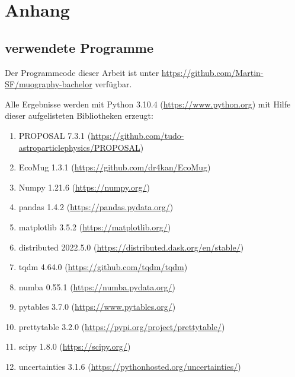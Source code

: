 \chapter{Anhang}


\section{verwendete Programme}

Der Programmcode dieser Arbeit ist unter 
\url{https://github.com/Martin-SF/muography-bachelor}
verfügbar.

Alle Ergebnisse werden mit Python 3.10.4 (\url{https://www.python.org})
mit Hilfe dieser aufgelisteten Bibliotheken erzeugt:
\begin{enumerate}
    \item PROPOSAL 7.3.1 (\url{https://github.com/tudo-astroparticlephysics/PROPOSAL})
    \item EcoMug 1.3.1 (\url{https://github.com/dr4kan/EcoMug})
    \item Numpy 1.21.6 (\url{https://numpy.org/})
    \item pandas 1.4.2 (\url{https://pandas.pydata.org/})
    \item matplotlib 3.5.2 (\url{https://matplotlib.org/})
    \item distributed 2022.5.0 (\url{https://distributed.dask.org/en/stable/})
    \item tqdm 4.64.0 (\url{https://github.com/tqdm/tqdm})
    \item numba 0.55.1 (\url{https://numba.pydata.org/})
    \item pytables 3.7.0 (\url{https://www.pytables.org/})
    \item prettytable 3.2.0 (\url{https://pypi.org/project/prettytable/})
    \item scipy 1.8.0 (\url{https://scipy.org/})
    \item uncertainties 3.1.6 (\url{https://pythonhosted.org/uncertainties/})
\end{enumerate}

